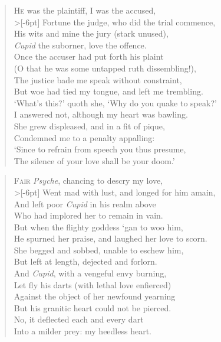 \documentclass[a5paper, 12pt, oneside]{memoir}
\begin{document}
\PoemTitle{}
\begin{verse}
    \lettrine{H}{e} was the plaintiff, I was the accused, \\>[-6pt]
    Fortune the judge, who did the trial commence, \\
    His wits and mine the jury (stark unused), \\
    \textit{Cupid} the suborner, love the offence. \\
    Once the accuser had put forth his plaint \\
    (O that he was some untapped ruth dissembling!), \\
    The justice bade me speak without constraint, \\
    But woe had tied my tongue, and left me trembling. \\
    `What's this?' quoth she, `Why do you quake to speak?' \\
    I answered not, although my heart was bawling. \\
    She grew displeased, and in a fit of pique, \\
    Condemned me to a penalty appalling: \\
    \vin `Since to refrain from speech you thus presume, \\
    \vin The silence of your love shall be your doom.'
\end{verse}

\PoemTitle{}
\begin{verse}
    \lettrine{F}{air} \textit{Psyche}, chancing to descry my love, \\>[-6pt]
    Went mad with lust, and longed for him amain, \\
    And left poor \textit{Cupid} in his realm above \\
    Who had implored her to remain in vain. \\
    But when the flighty goddess `gan to woo him, \\
    He spurned her praise, and laughed her love to scorn. \\
    She begged and sobbed, unable to eschew him, \\
    But left at length, dejected and forlorn. \\
    And \textit{Cupid}, with a vengeful envy burning, \\
    Let fly his darts (with lethal love enfierced) \\
    Against the object of her newfound yearning \\
    But his granitic heart could not be pierced. \\
    \vin No, it deflected each and every dart \\
    \vin Into a milder prey: my heedless heart.
\end{verse}
\end{document}
